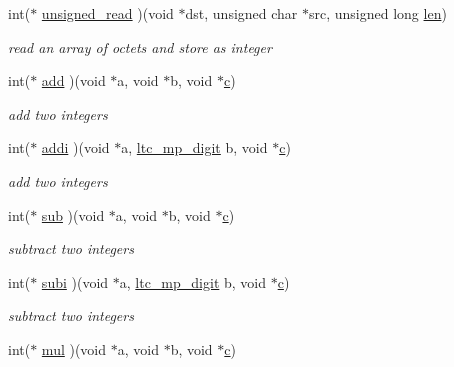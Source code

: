 \begin{DoxyCompactItemize}
int($\ast$ \mbox{\hyperlink{structltc__math__descriptor_a9f36dbadfa806134bb8be4125a18027d}{unsigned\+\_\+read}} )(void $\ast$dst, unsigned char $\ast$src, unsigned long \mbox{\hyperlink{pmac__init_8c_afed088663f8704004425cdae2120b9b3}{len}})
\begin{DoxyCompactList}\small\item\em read an array of octets and store as integer \end{DoxyCompactList}\item 
int($\ast$ \mbox{\hyperlink{structltc__math__descriptor_a2ee4cfad89c8d9197de3da244f97b111}{add}} )(void $\ast$a, void $\ast$b, void $\ast$\mbox{\hyperlink{khazad_8c_a86ea50de5a3e0ae87762f4298d35284c}{c}})
\begin{DoxyCompactList}\small\item\em add two integers \end{DoxyCompactList}\item 
int($\ast$ \mbox{\hyperlink{structltc__math__descriptor_a8920bd1f62e2345cdaa3dc423ac5b301}{addi}} )(void $\ast$a, \mbox{\hyperlink{tomcrypt__cfg_8h_a4e98fa26a5de0ac87e06af901bad57c4}{ltc\+\_\+mp\+\_\+digit}} b, void $\ast$\mbox{\hyperlink{khazad_8c_a86ea50de5a3e0ae87762f4298d35284c}{c}})
\begin{DoxyCompactList}\small\item\em add two integers \end{DoxyCompactList}\item 
int($\ast$ \mbox{\hyperlink{structltc__math__descriptor_ad58ab4f6ccb46060585efb0a6f934734}{sub}} )(void $\ast$a, void $\ast$b, void $\ast$\mbox{\hyperlink{khazad_8c_a86ea50de5a3e0ae87762f4298d35284c}{c}})
\begin{DoxyCompactList}\small\item\em subtract two integers \end{DoxyCompactList}\item 
int($\ast$ \mbox{\hyperlink{structltc__math__descriptor_a346773e3af932abe74f88d2dadd6541f}{subi}} )(void $\ast$a, \mbox{\hyperlink{tomcrypt__cfg_8h_a4e98fa26a5de0ac87e06af901bad57c4}{ltc\+\_\+mp\+\_\+digit}} b, void $\ast$\mbox{\hyperlink{khazad_8c_a86ea50de5a3e0ae87762f4298d35284c}{c}})
\begin{DoxyCompactList}\small\item\em subtract two integers \end{DoxyCompactList}\item 
int($\ast$ \mbox{\hyperlink{structltc__math__descriptor_ac70c777311b45bcca48b99003a00d68d}{mul}} )(void $\ast$a, void $\ast$b, void $\ast$\mbox{\hyperlink{khazad_8c_a86ea50de5a3e0ae87762f4298d35284c}{c}})

\end{DoxyCompactItemize}
